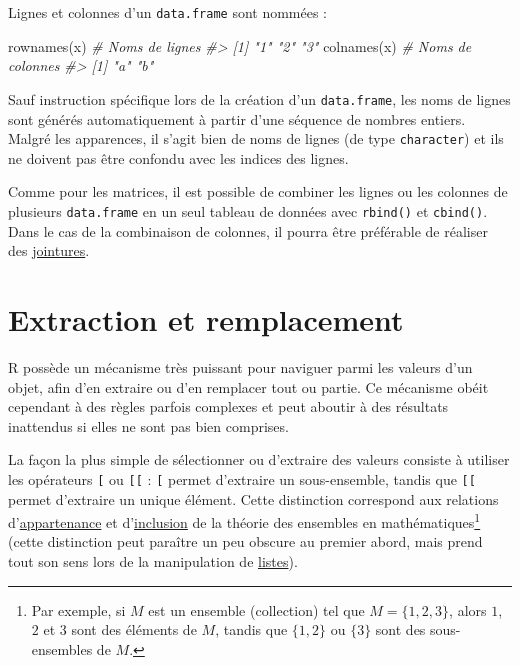 \documentclass[
  french,
]{scrbook}
\newenvironment{Shaded}{\begin{snugshade}}{\end{snugshade}}
\newcommand{\CommentTok}[1]{\textcolor[rgb]{0.56,0.35,0.01}{\textit{#1}}}
\newcommand{\FunctionTok}[1]{\textcolor[rgb]{0.00,0.00,0.00}{#1}}
\newcommand{\NormalTok}[1]{#1}
\begin{document}
Lignes et colonnes d'un \texttt{data.frame} sont nommées :

\begin{Shaded}
\begin{Highlighting}[]
\FunctionTok{rownames}\NormalTok{(x) }\CommentTok{\# Noms de lignes}
\CommentTok{\#\textgreater{} [1] "1" "2" "3"}
\FunctionTok{colnames}\NormalTok{(x) }\CommentTok{\# Noms de colonnes}
\CommentTok{\#\textgreater{} [1] "a" "b"}
\end{Highlighting}
\end{Shaded}

\begin{tcolorbox}[fonttitle=\sffamily\bfseries\large,title=Remarque,colframe=darkblue]

Sauf instruction spécifique lors de la création d'un \texttt{data.frame}, les noms de lignes sont générés automatiquement à partir d'une séquence de nombres entiers. Malgré les apparences, il s'agit bien de noms de lignes (de type \texttt{character}) et ils ne doivent pas être confondu avec les indices des lignes.

\end{tcolorbox}

Comme pour les matrices, il est possible de combiner les lignes ou les colonnes de plusieurs \texttt{data.frame} en un seul tableau de données avec \texttt{rbind()} et \texttt{cbind()}. Dans le cas de la combinaison de colonnes, il pourra être préférable de réaliser des \protect\hyperlink{data-jointures}{jointures}.

\hypertarget{subset}{%
\chapter{Extraction et remplacement}\label{subset}}

R possède un mécanisme très puissant pour naviguer parmi les valeurs d'un objet, afin d'en extraire ou d'en remplacer tout ou partie. Ce mécanisme obéit cependant à des règles parfois complexes et peut aboutir à des résultats inattendus si elles ne sont pas bien comprises.

La façon la plus simple de sélectionner ou d'extraire des valeurs consiste à utiliser les opérateurs \texttt{{[}} ou \texttt{{[}{[}} : \texttt{{[}} permet d'extraire un sous-ensemble, tandis que \texttt{{[}{[}} permet d'extraire un unique élément. Cette distinction correspond aux relations d'\href{https://fr.wikipedia.org/wiki/Appartenance_(math\%C3\%A9matiques)}{appartenance} et d'\href{https://fr.wikipedia.org/wiki/Inclusion_(math\%C3\%A9matiques)}{inclusion} de la théorie des ensembles en mathématiques\footnote{Par exemple, si \(M\) est un ensemble (collection) tel que \(M = \{1,2,3\}\), alors \(1\), \(2\) et \(3\) sont des éléments de \(M\), tandis que \(\{1,2\}\) ou \(\{3\}\) sont des sous-ensembles de \(M\).} (cette distinction peut paraître un peu obscure au premier abord, mais prend tout son sens lors de la manipulation de \protect\hyperlink{subset-list}{listes}).
\end{document}
